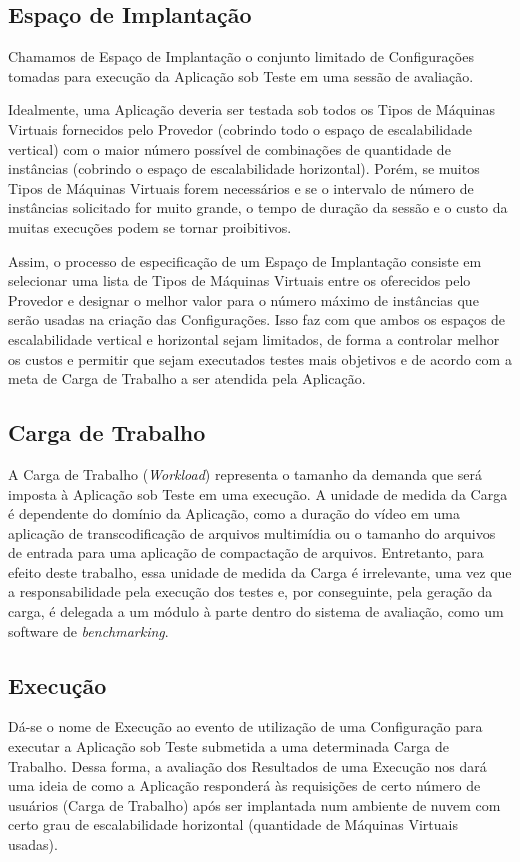 \subsection{Espaço de Implantação}
Chamamos de Espaço de Implantação o conjunto limitado de Configurações tomadas 
para execução da Aplicação sob Teste em uma sessão de avaliação.
 
Idealmente, uma Aplicação deveria ser testada sob todos os Tipos de Máquinas 
Virtuais fornecidos pelo Provedor (cobrindo todo o espaço de escalabilidade 
vertical) com o maior número possível de combinações de quantidade de instâncias 
(cobrindo o espaço de escalabilidade horizontal). Porém, se muitos Tipos de 
Máquinas Virtuais forem necessários e se o intervalo de número de instâncias 
solicitado for muito grande, o tempo de duração da sessão e o custo da muitas 
execuções podem se tornar proibitivos.

Assim, o processo de especificação de um Espaço de Implantação consiste em 
selecionar uma lista de Tipos de Máquinas Virtuais entre os oferecidos pelo 
Provedor e designar o melhor valor para o número máximo de instâncias que serão 
usadas na criação das Configurações. Isso faz com que ambos os espaços de 
escalabilidade vertical e horizontal sejam limitados, de forma a controlar 
melhor os custos e permitir que sejam executados testes mais objetivos e de 
acordo com a meta de Carga de Trabalho a ser atendida pela Aplicação.

\subsection{Carga de Trabalho}
A Carga de Trabalho (\emph{Workload}) representa o tamanho da demanda que será 
imposta à Aplicação sob Teste em uma execução. A unidade de medida da Carga é 
dependente do domínio da Aplicação, como a duração do vídeo em uma aplicação
de transcodificação de arquivos multimídia ou o tamanho do arquivos de entrada
para uma aplicação de compactação de arquivos. Entretanto, para efeito deste 
trabalho, essa unidade de medida da Carga é irrelevante, uma vez que a 
responsabilidade pela execução dos testes e, por conseguinte, pela geração da 
carga, é delegada a um módulo à parte dentro do sistema de avaliação, como um
software de \emph{benchmarking}.

\subsection{Execução}
Dá-se o nome de Execução ao evento de utilização de uma Configuração para 
executar a Aplicação sob Teste submetida a uma determinada Carga de Trabalho. 
Dessa forma, a avaliação dos Resultados de uma Execução nos dará uma ideia de 
como a Aplicação responderá às requisições de certo número de usuários (Carga de Trabalho) 
após ser implantada num ambiente de nuvem com certo grau de escalabilidade 
horizontal (quantidade de Máquinas Virtuais usadas). 

